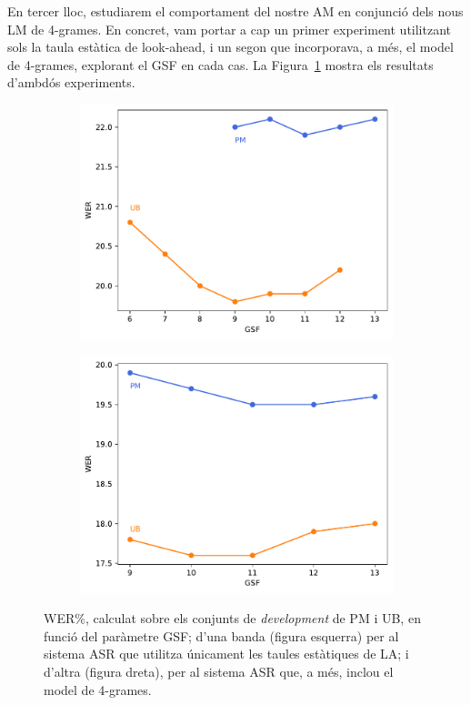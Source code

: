 En tercer lloc, estudiarem el comportament del nostre AM en conjunció dels nous LM de 4-grames.
En concret, vam portar a cap un primer experiment utilitzant sols la taula estàtica de look-ahead, i un segon que incorporava, a més, el model de 4-grames, explorant el GSF en cada cas.
La Figura~\ref{fig:gsf_newlm_sb} mostra els resultats d'ambdós experiments.

\begin{figure}[ht!]
    \centering
    \begin{subfigure}{0.45\textwidth}
        \centering
        \includegraphics[width=\textwidth]{figuras/gsf_newlm_small.pdf}
    \end{subfigure}
    \begin{subfigure}{0.45\textwidth}
        \centering
        \includegraphics[width=\textwidth]{figuras/gsf_newlm_big.pdf}
    \end{subfigure}
    \caption{WER\%, calculat sobre els conjunts de \textit{development} de PM i UB, en funció del paràmetre GSF; d'una banda (figura esquerra) per al sistema ASR que utilitza únicament les taules estàtiques de LA; i d'altra (figura dreta), per al sistema ASR que, a més, inclou el model de 4-grames.}
    \label{fig:gsf_newlm_sb}
\end{figure}

